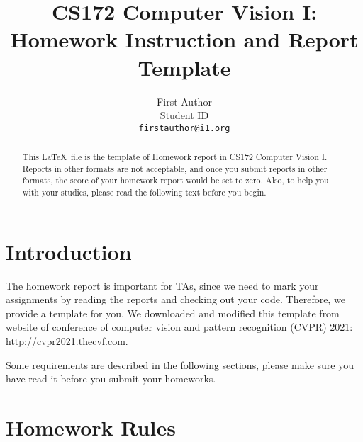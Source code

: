 \documentclass[10pt,twocolumn,letterpaper]{article}
\begin{document}
\title{CS172 Computer Vision I: \\ Homework Instruction and Report Template}

\author{First Author\\
Student ID\\
{\tt\small firstauthor@i1.org}
}

\maketitle

\begin{abstract}
This \LaTeX\ file is the template of Homework report in CS172 Computer Vision I. Reports in other formats are not acceptable, and once you submit reports in other formats, the score of your homework report would be set to zero. Also, to help you with your studies, please read the following text before you begin.
\end{abstract}

\section{Introduction}
The homework report is important for TAs, since we need to mark your assignments by reading the reports and checking out your code. Therefore, we provide a template for you. We downloaded and modified this template from website of conference of computer vision and pattern recognition (CVPR) 2021: \url{http://cvpr2021.thecvf.com}.

Some requirements are described in the following sections, please make sure you have read it before you submit your homeworks.

\section{Homework Rules}
\end{document}
